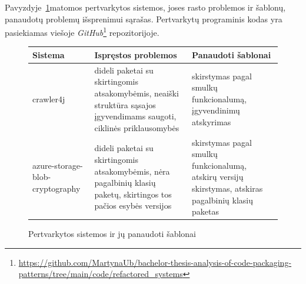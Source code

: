 Pavyzdyje~\ref{table:sistemos}matomos pertvarkytos sistemos, joses rasto problemos ir šablonų, panaudotų problemų išsprenimui sąrašas.
Pertvarkytų programinis kodas yra pasiekiamas viešoje \textit{GitHub}\footnote{\url{https://github.com/MartynaUb/bachelor-thesis-analysis-of-code-packaging-patterns/tree/main/code/refactored_systems}} repozitorijoje.
\begin{figure}[H]
    \begin{tabular}{|p{2cm}|p{7cm}|p{7cm}|}
        \hline
        Sistema                                                                                           & Ispręstos problemos                                                                                                   & Panaudoti šablonai                                                                                    \\ \hline\hline
        crawler4j                        & dideli paketai su skirtingomis atsakomybėmis, neaiški struktūra sąsajos įgyvendimams saugoti, ciklinės priklausomybės & skirstymas pagal smulkų funkcionalumą, įgyvendinimų atskyrimas                                        \\ \hline
        azure-storage-blob-cryptography  & dideli paketai su skirtingomis atsakomybėmis, nėra pagalbinių klasių paketų, skirtingos tos pačios esybės versijos    & skirstymas pagal smulkų funkcionalumą, atskirų versijų skirstymas, atskiras pagalbinių klasių paketas \\ \hline
    \end{tabular}
    \caption{Pertvarkytos sistemos ir jų panaudoti šablonai}
    \label{table:sistemos}
\end{figure}